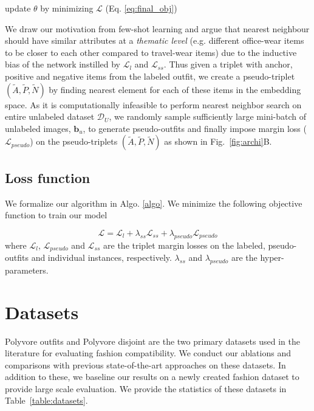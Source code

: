 \documentclass[sigconf]{acmart}
\newcommand{\algocomment}[1]{{\color{algoGray} #1}}
\begin{document}
\begin{algorithm}
\begin{algorithmic}[1]
\STATE \vspace{1.5mm} \hspace{0.1in}\algocomment{{// Minimize the final objective}}
\STATE \hspace{0.1in} update $\theta$ by minimizing $\mathcal{L}$  (Eq. \ref{eq:final_obj})

\ENDFOR
\end{algorithmic}
\end{algorithm}


We draw our motivation from few-shot learning \cite{snell2017prototypical} and argue that nearest neighbour should have similar attributes at a \textit{thematic level} (e.g. different office-wear items to be closer to each other compared to travel-wear items) due to the inductive bias of the network instilled by $\mathcal{L}_{l}$ and $\mathcal{L}_{ss}$.
Thus given a triplet with anchor, positive and negative items from the labeled outfit, we create a pseudo-triplet $(\tilde{A}, \tilde{P}, \tilde{N})$ by finding nearest element for each of these items in the embedding space. As it is computationally infeasible to perform nearest neighbor search on entire unlabeled dataset $\mathcal{D}_U$, we randomly sample sufficiently large mini-batch of unlabeled images, $\mathbf{b}_u$, to generate pseudo-outfits and finally impose margin loss ($\mathcal{L}_{pseudo}$) on the pseudo-triplets $(\tilde{A}, \tilde{P}, \tilde{N})$ as shown in Fig.~\ref{fig:archi}{B}.

\subsection{Loss function}

We formalize our algorithm in Algo. \ref{algo}. We minimize the following objective function to train our model

\begin{equation}
    \mathcal{L}=\mathcal{L}_{l}+\lambda_{ss}\mathcal{L}_{ss}+\lambda_{pseudo}\mathcal{L}_{pseudo}
    \label{eq:final_obj}
\end{equation}
where $\mathcal{L}_{l}$, $\mathcal{L}_{pseudo}$ and $\mathcal{L}_{ss}$ are the triplet margin losses on the labeled, pseudo-outfits and individual instances, respectively. $\lambda_{ss}$ and $\lambda_{pseudo}$ are the hyper-parameters.

 
\section{Datasets}
Polyvore outfits \cite{eccv2018learning} and Polyvore disjoint \cite{eccv2018learning} are the two primary datasets used in the literature for evaluating fashion compatibility. We conduct our ablations and comparisons with previous state-of-the-art approaches on these datasets. In addition to these, we baseline our results on a newly created fashion dataset to provide large scale evaluation. We provide the statistics of these datasets in Table~\ref{table:datasets}.
\end{document}
